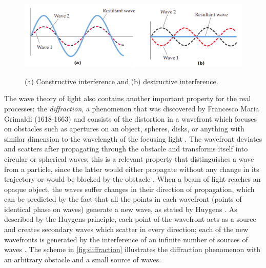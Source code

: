\begin{figure}[htb]
	\centering
	\caption{\label{fig:interference} 
	    (a) Constructive interference and (b) destructive interference.}
	\begin{center}
	    \includegraphics[width=\textwidth,height=4cm, trim=1 1 1 1,clip]{images/interference.png}
	\end{center}
	\centering
\end{figure}

The wave theory of light also contains another important property for the real processes: the \emph{diffraction}, a phenomenon that was discovered by Francesco Maria Grimaldi (1618-1663) and consists of the distortion in a wavefront which focuses on obstacles such as apertures on an object, spheres, disks, or anything with similar dimension to the wavelength of the focusing light \cite{zilio2009optica}. The wavefront deviates and scatters after propagating through the obstacle and transforms itself into circular or spherical waves; this is a relevant property that distinguishes a wave from a particle, since the latter would either propagate without any change in its trajectory or would be blocked by the obstacle \cite{tipler2007physics}. When a beam of light reaches an opaque object, the waves suffer changes in their direction of propagation, which can be predicted by the fact that all the points in each wavefront (points of identical phase on waves) generate a new wave, as stated by Huygens \cite{fowles1989introduction}. As described by the Huygens principle, each point of the wavefront acts as a source and creates secondary waves which scatter in every direction; each of the new wavefronts is generated by the interference of an infinite number of sources of waves \cite{zilio2009optica}. The scheme in \autoref{fig:diffraction} illustrates the diffraction phenomenon with an arbitrary obstacle and a small source of waves.

